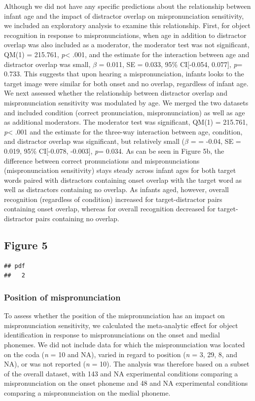 \documentclass[man]{apa6}
\theoremstyle{definition}
\theoremstyle{definition}
\theoremstyle{definition}
\theoremstyle{remark}
\begin{document}
Although we did not have any specific predictions about the relationship
between infant age and the impact of distractor overlap on
mispronunciation sensitivity, we included an exploratory analysis to
examine this relationship. First, for object recognition in response to
mispronunciations, when age in addition to distractor overlap was also
included as a moderator, the moderator test was not significant, QM(1) =
215.761, \emph{p}\textless{} .001, and the estimate for the interaction
between age and distractor overlap was small, \(\beta\) = 0.011, SE =
0.033, 95\% CI{[}-0.054, 0.077{]}, \emph{p}= 0.733. This suggests that
upon hearing a mispronunciation, infants looks to the target image were
similar for both onset and no overlap, regardless of infant age. We next
assessed whether the relationship between distractor overlap and
mispronunciation sensitivity was modulated by age. We merged the two
datasets and included condition (correct pronunciation,
mispronunciation) as well as age as additional moderators. The moderator
test was significant, QM(1) = 215.761, \emph{p}\textless{} .001 and the
estimate for the three-way interaction between age, condition, and
distractor overlap was significant, but relatively small (\(\beta\) = =
-0.04, SE = 0.019, 95\% CI{[}-0.078, -0.003{]}, \emph{p}= 0.034. As can
be seen in Figure 5b, the difference between correct pronunciations and
mispronunciations (mispronunciation sensitivity) stays steady across
infant ages for both target words paired with distractors containing
onset overlap with the target word as well as distractors containing no
overlap. As infants aged, however, overall recognition (regardless of
condition) increased for target-distractor pairs containing onset
overlap, whereas for overall recognition decreased for target-distractor
pairs containing no overlap.

\subsection{Figure 5}\label{figure-5}

\begin{verbatim}
## pdf 
##   2
\end{verbatim}

\subsubsection{Position of
mispronunciation}\label{position-of-mispronunciation}

To assess whether the position of the mispronunciation has an impact on
mispronunciation sensitivity, we calculated the meta-analytic effect for
object identification in response to mispronunciations on the onset and
medial phonemes. We did not include data for which the mispronunciation
was located on the coda (\emph{n} = 10 and NA), varied in regard to
position (\emph{n} = 3, 29, 8, and NA), or was not reported (\emph{n} =
10). The analysis was therefore based on a subset of the overall
dataset, with 143 and NA experimental conditions comparing a
mispronunciation on the onset phoneme and 48 and NA experimental
conditions comparing a mispronunciation on the medial phoneme.
\end{document}
